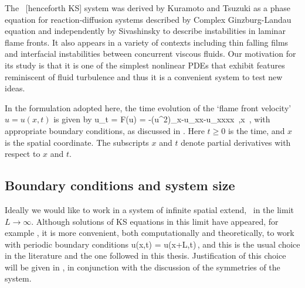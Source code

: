
The \KS\ [henceforth KS] system was derived by
Kuramoto and Tsuzuki as a phase equation for
reaction-diffusion systems described by Complex Ginzburg-Landau
equation and independently by Sivashinsky to describe
instabilities in laminar flame fronts. It also appears
in a variety of contexts including thin falling
films and interfacial instabilities between
concurrent viscous fluids.
Our motivation for its study is that it is one of the simplest
nonlinear PDEs that exhibit features reminiscent of fluid
turbulence and thus it is a convenient system to test new ideas.

 In the formulation
adopted here, the time evolution of the `flame front velocity'
$u=u(x,t)$ %
is given by
\beq
  u_t = F(u) = -{\textstyle{}}(u^2)_x-u_{xx}-u_{xxxx}
    \,,\qquad   x \in [-L/2,L/2]
    \,,
with appropriate boundary conditions, as discussed in .
Here $t \geq 0$ is the time, and $x$ is the spatial coordinate.
The subscripts $x$ and $t$ denote partial derivatives with respect to
$x$ and $t$.

\subsection{Boundary conditions and system size}
\label{sec:KSbc}

Ideally we would like to work in a system of infinite spatial extend, \ie\ in the limit $L\rightarrow\infty$.
Although solutions of KS equations in this limit have appeared, \cf for example , it is
more convenient, both computationally and theoretically, to work with periodic boundary conditions
\beq
  u(x,t) = u(x+L,t)\,,
 \label{eq:KSper}
\eeq
and this is the usual choice in the literature and the one followed in this thesis.
Justification of this choice will be given
in , in conjunction with the discussion of the symmetries of the system.

